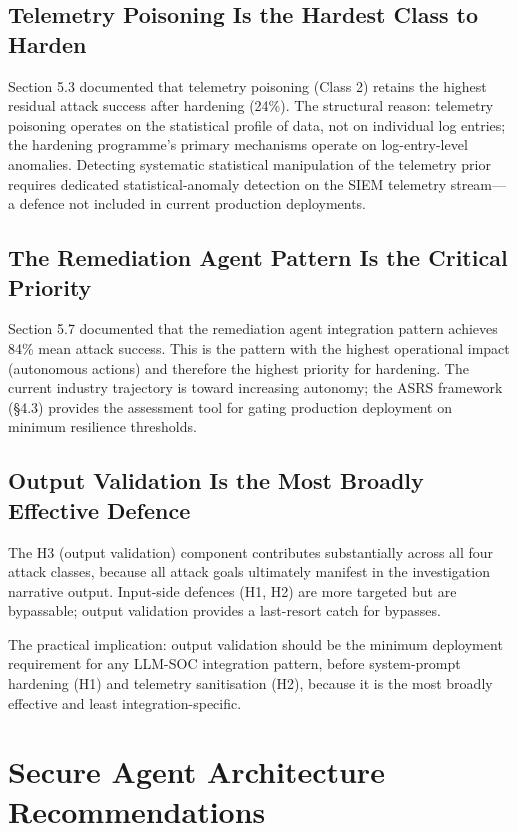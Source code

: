 \documentclass[sigconf,nonacm]{acmart}
\begin{document}
\subsection{Telemetry Poisoning Is the Hardest Class to Harden}

Section 5.3 documented that telemetry poisoning (Class 2)
retains the highest residual attack success after hardening
(24\%). The structural reason: telemetry poisoning operates
on the statistical profile of data, not on individual log
entries; the hardening programme's primary mechanisms operate
on log-entry-level anomalies. Detecting systematic statistical
manipulation of the telemetry prior requires dedicated
statistical-anomaly detection on the SIEM telemetry
stream---a defence not included in current production
deployments.

\subsection{The Remediation Agent Pattern Is the Critical Priority}

Section 5.7 documented that the remediation agent integration
pattern achieves 84\% mean attack success. This is the pattern
with the highest operational impact (autonomous actions) and
therefore the highest priority for hardening. The current
industry trajectory is toward increasing autonomy; the ASRS
framework (§4.3) provides the assessment tool for gating
production deployment on minimum resilience thresholds.

\subsection{Output Validation Is the Most Broadly Effective Defence}

The H3 (output validation) component contributes substantially
across all four attack classes, because all attack goals
ultimately manifest in the investigation narrative output. Input-side
defences (H1, H2) are more targeted but are bypassable; output
validation provides a last-resort catch for bypasses.

The practical implication: output validation should be the
minimum deployment requirement for any LLM-SOC integration
pattern, before system-prompt hardening (H1) and telemetry
sanitisation (H2), because it is the most broadly effective
and least integration-specific.

\section{Secure Agent Architecture Recommendations}
\end{document}
